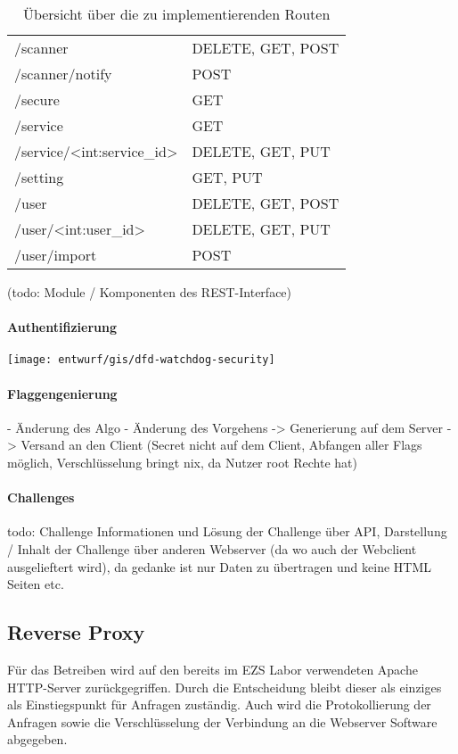 \begin{table}
\begin{tabular}{l l}
		/scanner								 & DELETE, GET, POST \\
		/scanner/notify							 & POST \\
		/secure									 & GET \\
		/service								 & GET \\
		/service/<int:service\_id>				 & DELETE, GET, PUT \\
		/setting								 & GET, PUT \\
		/user									 & DELETE, GET, POST \\
		/user/<int:user\_id>					 & DELETE, GET, PUT \\
		/user/import							 & POST \\
	\end{tabular}
	\caption{Übersicht über die zu implementierenden Routen}
	\label{table:gis-routes}
\end{table}


(todo: Module / Komponenten des REST-Interface)
\paragraph{Authentifizierung}

\texttt{[image: entwurf/gis/dfd-watchdog-security]}

\paragraph{Flaggengenierung}
- Änderung des Algo
- Änderung des Vorgehens -> Generierung auf dem Server -> Versand an den Client (Secret nicht auf dem Client, Abfangen aller Flags möglich, Verschlüsselung bringt nix, da Nutzer root Rechte hat)

\paragraph{Challenges}
todo:
Challenge Informationen und Lösung der Challenge über API, Darstellung / Inhalt der Challenge über anderen Webserver (da wo auch der Webclient ausgelieftert wird), da gedanke ist nur Daten zu übertragen und keine HTML Seiten etc.

\subsection{Reverse Proxy}
Für das Betreiben wird auf den bereits im EZS Labor verwendeten Apache HTTP-Server zurückgegriffen. Durch die Entscheidung bleibt dieser als einziges als Einstiegspunkt für Anfragen zuständig. Auch wird die Protokollierung der Anfragen sowie die Verschlüsselung der Verbindung an die Webserver Software abgegeben.

